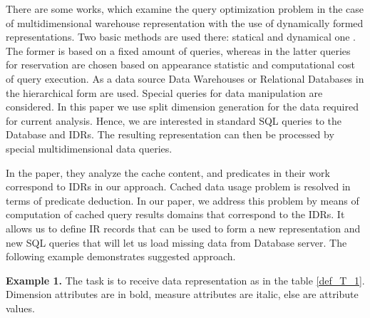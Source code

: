 \documentclass[10pt,journal,cspaper,compsoc]{IEEEtran}
\begin{document}
There are some works, which examine the query optimization problem in the case of
multidimensional warehouse representation with the use of dynamically formed
representations. Two basic methods are used there: statical \cite{baralis,
gupta, gupta-mumick} and dynamical one \cite{scheuermann, shim, kalnis, chang}.
The former is based on a fixed amount of queries, whereas in the latter queries
for reservation are chosen based on appearance statistic and computational cost
of query execution. As a data source Data Warehouses or Relational Databases in
the hierarchical form are used. Special queries for data manipulation are
considered. In this paper we use split dimension generation for the data
required for current analysis. Hence, we are interested in standard SQL queries
to the Database and IDRs. The resulting representation can then be processed by
special multidimensional data queries.

In the \cite{Keller96} paper, they analyze the cache content,
and predicates in their work correspond to IDRs in our approach. Cached data
usage problem is resolved in terms of predicate deduction. In our paper, we address this problem by means of
computation of cached query results domains that correspond to the IDRs. It allows
us to define IR records that can be used to form a new representation and new SQL
queries that will let us load missing data from Database server. The following
example demonstrates suggested approach.


{\bf Example 1.} The task is to receive data representation as in the table
\ref{def_T_1}. Dimension attributes are in bold, measure attributes are italic,
else are attribute values.
\end{document}

